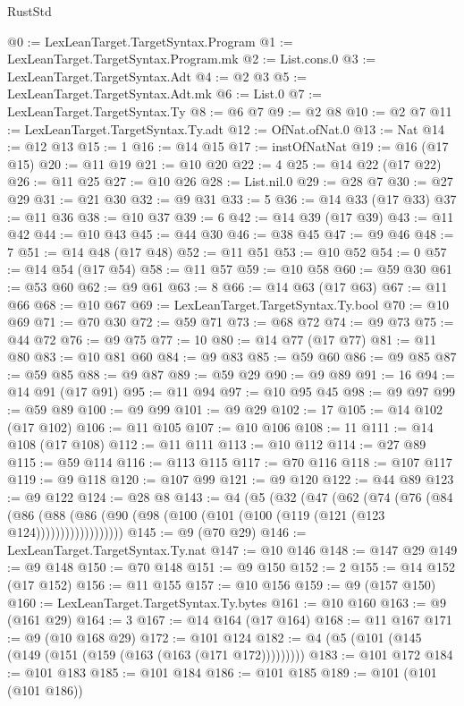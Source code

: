\begin{lexlean}{RustStd}
\begin{coremodule}
@0 := LexLeanTarget.TargetSyntax.Program
@1 := LexLeanTarget.TargetSyntax.Program.mk
@2 := List.cons.{0}
@3 := LexLeanTarget.TargetSyntax.Adt
@4 := @2 @3
@5 := LexLeanTarget.TargetSyntax.Adt.mk
@6 := List.{0}
@7 := LexLeanTarget.TargetSyntax.Ty
@8 := @6 @7
@9 := @2 @8
@10 := @2 @7
@11 := LexLeanTarget.TargetSyntax.Ty.adt
@12 := OfNat.ofNat.{0}
@13 := Nat
@14 := @12 @13
@15 := 1
@16 := @14 @15
@17 := instOfNatNat
@19 := @16 (@17 @15)
@20 := @11 @19
@21 := @10 @20
@22 := 4
@25 := @14 @22 (@17 @22)
@26 := @11 @25
@27 := @10 @26
@28 := List.nil.{0}
@29 := @28 @7
@30 := @27 @29
@31 := @21 @30
@32 := @9 @31
@33 := 5
@36 := @14 @33 (@17 @33)
@37 := @11 @36
@38 := @10 @37
@39 := 6
@42 := @14 @39 (@17 @39)
@43 := @11 @42
@44 := @10 @43
@45 := @44 @30
@46 := @38 @45
@47 := @9 @46
@48 := 7
@51 := @14 @48 (@17 @48)
@52 := @11 @51
@53 := @10 @52
@54 := 0
@57 := @14 @54 (@17 @54)
@58 := @11 @57
@59 := @10 @58
@60 := @59 @30
@61 := @53 @60
@62 := @9 @61
@63 := 8
@66 := @14 @63 (@17 @63)
@67 := @11 @66
@68 := @10 @67
@69 := LexLeanTarget.TargetSyntax.Ty.bool
@70 := @10 @69
@71 := @70 @30
@72 := @59 @71
@73 := @68 @72
@74 := @9 @73
@75 := @44 @72
@76 := @9 @75
@77 := 10
@80 := @14 @77 (@17 @77)
@81 := @11 @80
@83 := @10 @81 @60
@84 := @9 @83
@85 := @59 @60
@86 := @9 @85
@87 := @59 @85
@88 := @9 @87
@89 := @59 @29
@90 := @9 @89
@91 := 16
@94 := @14 @91 (@17 @91)
@95 := @11 @94
@97 := @10 @95 @45
@98 := @9 @97
@99 := @59 @89
@100 := @9 @99
@101 := @9 @29
@102 := 17
@105 := @14 @102 (@17 @102)
@106 := @11 @105
@107 := @10 @106
@108 := 11
@111 := @14 @108 (@17 @108)
@112 := @11 @111
@113 := @10 @112
@114 := @27 @89
@115 := @59 @114
@116 := @113 @115
@117 := @70 @116
@118 := @107 @117
@119 := @9 @118
@120 := @107 @99
@121 := @9 @120
@122 := @44 @89
@123 := @9 @122
@124 := @28 @8
@143 := @4
    (@5
      (@32
        (@47
          (@62
            (@74
              (@76
                (@84
                  (@86
                    (@88 (@86 (@90 (@98 (@100 (@101 (@100 (@119 (@121 (@123 @124))))))))))))))))))
@145 := @9 (@70 @29)
@146 := LexLeanTarget.TargetSyntax.Ty.nat
@147 := @10 @146
@148 := @147 @29
@149 := @9 @148
@150 := @70 @148
@151 := @9 @150
@152 := 2
@155 := @14 @152 (@17 @152)
@156 := @11 @155
@157 := @10 @156
@159 := @9 (@157 @150)
@160 := LexLeanTarget.TargetSyntax.Ty.bytes
@161 := @10 @160
@163 := @9 (@161 @29)
@164 := 3
@167 := @14 @164 (@17 @164)
@168 := @11 @167
@171 := @9 (@10 @168 @29)
@172 := @101 @124
@182 := @4 (@5 (@101 (@145 (@149 (@151 (@159 (@163 (@163 (@171 @172)))))))))
@183 := @101 @172
@184 := @101 @183
@185 := @101 @184
@186 := @101 @185
@189 := @101 (@101 (@101 @186))

\end{coremodule}
\end{lexlean}
